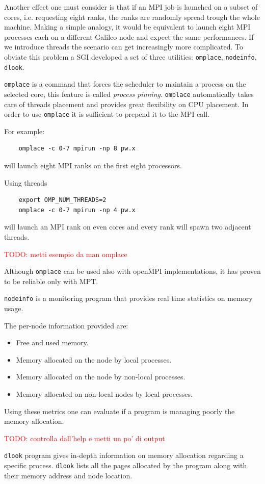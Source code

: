 \documentclass[a4paper,12pt]{article}
\newcommand\mynotes[1]{\begin{flushright}

\textcolor{red}{TODO: #1}\end{flushright}}
\begin{document}
Another effect one must consider is that if an MPI job is launched on a subset of cores, i.e. requesting eight ranks, the ranks are randomly spread trough the whole machine.
Making a simple analogy, it would be equivalent to launch eight MPI processes each on a different Galileo node and expect the same performances.
If we introduce threads the scenario can get increasingly more complicated.
To obviate this problem a SGI developed a set of three utilities: \texttt{omplace}, \texttt{nodeinfo}, \texttt{dlook}.

\texttt{omplace} is a command that forces the scheduler to maintain a process on the selected core, this feature is called \textit{process pinning}. 
\texttt{omplace} automatically takes care of threads placement and provides great flexibility on CPU placement.
In order to use \texttt{omplace} it is sufficient to prepend it to the MPI call.

For example:
\begin{verbatim}
	omplace -c 0-7 mpirun -np 8 pw.x
\end{verbatim}
will launch eight MPI ranks on the first eight processors.

Using threads 
\begin{verbatim}
	export OMP_NUM_THREADS=2
	omplace -c 0-7 mpirun -np 4 pw.x
\end{verbatim}
will launch an MPI rank on even cores and every rank will spawn two adjacent threads.
\mynotes{metti esempio da man omplace}

Although \texttt{omplace} can be used also with openMPI implementations, it has proven to be reliable only with MPT.

\texttt{nodeinfo} is a monitoring program that provides real time statistics on memory usage.

The per-node information provided are:
\begin{itemize}
	\item Free and used memory.
	\item Memory allocated on the node by local processes.
	\item Memory allocated on the node by non-local processes.
	\item Memory allocated on non-local nodes by local processes.
\end{itemize}

Using these metrics one can evaluate if a program is managing poorly the memory allocation.
\mynotes{controlla dall'help e metti un po' di output}

\texttt{dlook} program gives in-depth information on memory allocation regarding a specific process.
\texttt{dlook} lists all the pages allocated by the program along with their memory address and node location.
\end{document}
